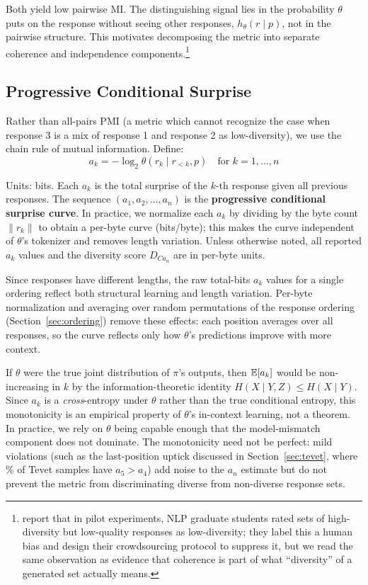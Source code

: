 Both yield low pairwise MI.
The distinguishing signal lies in the probability $\theta$ puts on the response without seeing other responses, $h_\theta(r \mid p)$, not in the pairwise structure.
This motivates decomposing the metric into separate coherence and independence components.\footnote{\citet{tevet2020evaluating} report that in pilot experiments, NLP graduate students rated sets of high-diversity but low-quality responses as low-diversity; they label this a human bias and design their crowdsourcing protocol to suppress it, but we read the same observation as evidence that coherence is part of what ``diversity'' of a generated set actually means.}

\subsection{Progressive Conditional Surprise}\label{sec:progressive-conditioning}

Rather than all-pairs PMI (a metric which cannot recognize the case when response 3 is a mix of response 1 and response 2 as low-diversity), we use the chain rule of mutual information.
Define:
\begin{equation}\label{eq:ak}
    a_k = -\log_2 \theta(r_k \mid r_{<k}, p) \quad \text{for } k = 1, \ldots, n
\end{equation}

Units: bits.
Each $a_k$ is the total surprise of the $k$-th response given all previous responses.
The sequence $(a_1, a_2, \ldots, a_n)$ is the \textbf{progressive conditional surprise curve}.
In practice, we normalize each $a_k$ by dividing by the byte count $\|r_k\|$ to obtain a per-byte curve (bits/byte); this makes the curve independent of $\theta$'s tokenizer and removes length variation.
Unless otherwise noted, all reported $a_k$ values and the diversity score $D_{Ca_n}$ are in per-byte units.

Since responses have different lengths, the raw total-bits $a_k$ values for a single ordering reflect both structural learning and length variation.
Per-byte normalization and averaging over random permutations of the response ordering (Section~\ref{sec:ordering}) remove these effects: each position averages over all responses, so the curve reflects only how $\theta$'s predictions improve with more context.

If $\theta$ were the true joint distribution of $\pi$'s outputs, then $\mathbb{E}[a_k]$ would be non-increasing in $k$ by the information-theoretic identity $H(X \mid Y, Z) \leq H(X \mid Y)$.
Since $a_k$ is a \emph{cross}-entropy under $\theta$ rather than the true conditional entropy, this monotonicity is an empirical property of $\theta$'s in-context learning, not a theorem.
In practice, we rely on $\theta$ being capable enough that the model-mismatch component does not dominate.
The monotonicity need not be perfect: mild violations (such as the last-position uptick discussed in Section~\ref{sec:tevet}, where \tevetLastUptickPct\% of Tevet samples have $a_5 > a_4$) add noise to the $a_n$ estimate but do not prevent the metric from discriminating diverse from non-diverse response sets.

